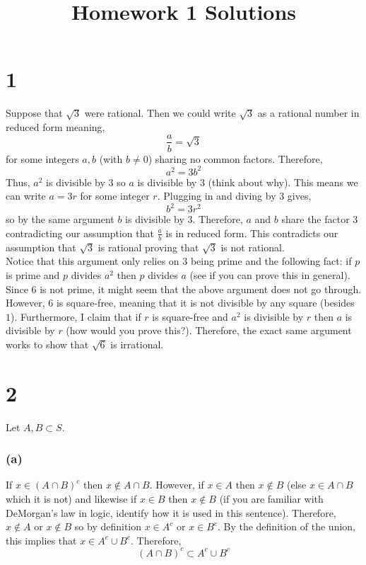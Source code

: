 \documentclass[12pt]{article}
\begin{document}
\title{Homework 1 Solutions}

\maketitle

\section*{1}

Suppose that $\sqrt{3}$ were rational. Then we could write $\sqrt{3}$ as a rational number in reduced form meaning,
\[ \frac{a}{b} = \sqrt{3} \]
for some integers $a,b$ (with $b \neq 0$) sharing no common factors. Therefore,
\[ a^2 = 3 b^2 \]
Thus, $a^2$ is divisible by $3$ so $a$ is divisible by $3$ (think about why). This means we can write $a = 3 r$ for some integer $r$. Plugging in and diving by $3$ gives,
\[ b^2 = 3 r^2 \]
so by the same argument $b$ is divisible by $3$. Therefore, $a$ and $b$ share the factor $3$ contradicting our assumption that $\frac{a}{b}$ is in reduced form. This contradicts our assumption that $\sqrt{3}$ is rational proving that $\sqrt{3}$ is not rational.
\bigskip\\
Notice that this argument only relies on $3$ being prime and the following fact: if $p$ is prime and $p$ divides $a^2$ then $p$ divides $a$ (see if you can prove this in general).
\bigskip\\
Since $6$ is not prime, it might seem that the above argument does not go through. However, $6$ is square-free, meaning that it is not divisible by any square (besides $1$). Furthermore, I claim that if $r$ is square-free and $a^2$ is divisible by $r$ then $a$ is divisible by $r$ (how would you prove this?). Therefore, the exact same argument works to show that $\sqrt{6}$ is irrational.

\section*{2}

Let $A, B \subset S$. 

\subsubsection*{(a)}

If $x \in (A \cap B)^c$ then $x \notin A \cap B$. However, if $x \in A$ then $x \notin B$ (else $x \in A \cap B$ which it is not) and likewise if $x \in B$ then $x \notin B$ (if you are familiar with DeMorgan's law in logic, identify how it is used in this sentence). Therefore, $x \notin A$ or $x \notin B$ so by definition $x \in A^c$ or $x \in B^c$. By the definition of the union, this implies that $x \in A^c \cup B^c$. Therefore,
\[ (A \cap B)^c \subset A^c \cup B^c \]
\end{document}
